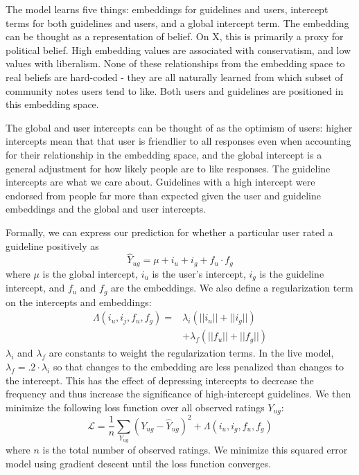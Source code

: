 \documentclass{article}
\begin{document}
\begin{multicols}{2}
The model learns five things: embeddings for guidelines and users, intercept terms for both guidelines and users, and a global intercept term. The embedding can be thought as a representation of belief. On X, this is primarily a proxy for political belief. High embedding values are associated with conservatism, and low values with liberalism. None of these relationships from the embedding space to real beliefs are hard-coded - they are all naturally learned from which subset of community notes users tend to like. Both users and guidelines are positioned in this embedding space.

The global and user intercepts can be thought of as the optimism of users: higher intercepts mean that that user is friendlier to all responses even when accounting for their relationship in the embedding space, and the global intercept is a general adjustment for how likely people are to like responses.
The guideline intercepts are what we care about. Guidelines with a high intercept were endorsed from people far more than expected given the user and guideline embeddings and the global and user intercepts.

Formally, we can express our prediction for whether a particular user rated a guideline positively as
 $$ \hat Y_{ug} = \mu + i_u + i_g +f_u \cdot f_g$$
 where $\mu$ is the global intercept, $i_u$ is the user's intercept, $i_g$ is the guideline intercept, and $f_u$ and $f_g$ are the embeddings. We also define a regularization term on the intercepts and embeddings:
 \begin{align*}
 \Lambda( i_u, i_j, f_u, f_g) = & \lambda_i \left(||i_u|| + ||i_g||\right)\\
                                & + \lambda_f \left(||f_u|| + ||f_g||\right)
 \end{align*}
 $\lambda_i$ and $\lambda_f$ are constants to weight the regularization terms. In the live model, $\lambda_f = .2 \cdot \lambda_i$ so that changes to the embedding are less penalized than changes to the intercept. This has the effect of depressing intercepts to decrease the frequency and thus increase the significance of high-intercept guidelines. 
 We then minimize the following loss function over all observed ratings $Y_{ug}$:
$$
\mathscr{L} = \frac{1}{n}\sum_{Y_{ug}} \left(Y_{ug} - \hat Y_{ug}\right)^2 + \Lambda( i_u, i_g, f_u, f_g)
$$
where  $n$ is the total number of observed ratings. We minimize this squared error model using gradient descent until the loss function converges.


\end{multicols}
\end{document}
